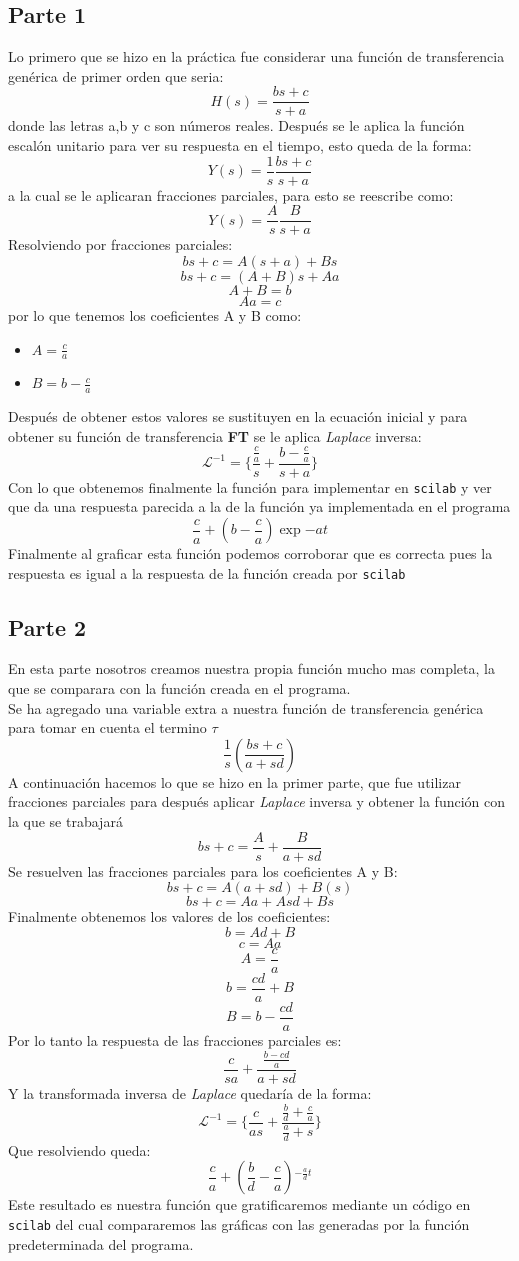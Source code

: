 \documentclass[letterpaper,10pt]{article}
\begin{document}
	\subsection{Parte 1}
	Lo primero que se hizo en la práctica fue considerar una función de transferencia genérica de primer orden que seria:
	\[H(s)=\frac{bs+c}{s+a}\]
	donde las letras a,b y c son números reales. Después se le aplica la función escalón unitario para ver su respuesta en el tiempo, esto queda de la forma:
	\[Y(s)=\frac{1}{s}\frac{bs+c}{s+a}\]
	a la cual se le aplicaran fracciones parciales, para esto se reescribe como:
	\[Y(s)=\frac{A}{s}\frac{B}{s+a}\]
	Resolviendo por fracciones parciales:
	\[bs+c=A(s+a)+Bs\]
	\[bs+c=(A+B)s+Aa\]
	\[A+B=b\]
	\[Aa=c\]
	por lo que tenemos los coeficientes A y B como:
	\begin{itemize}
		\item $A=\frac{c}{a}$
		\item $B=b-\frac{c}{a}$
	\end{itemize}
Después de obtener estos valores se sustituyen en la ecuación inicial y para obtener su función de transferencia \textbf{FT} se le aplica \textit{Laplace} inversa:
\[\mathcal{L}^{-1}=\{\frac{\frac{c}{a}}{s}+\frac{b-\frac{c}{a}}{s+a}\}\]
Con lo que obtenemos finalmente la función para implementar en \texttt{scilab} y ver que da una respuesta parecida a la de la función ya implementada en el programa
\[\frac{c}{a}+(b-\frac{c}{a})\exp{-at} \]
Finalmente al graficar esta función podemos corroborar que es correcta pues la respuesta es igual a la respuesta de la función creada por \texttt{scilab}
\pagebreak 
	\subsection{Parte 2}
	En esta parte nosotros creamos nuestra propia función mucho mas completa, la que se comparara con la función creada en el programa.\\
	Se ha agregado una variable extra a nuestra función de transferencia genérica para tomar en cuenta el termino $\tau$\\
	\[\frac{1}{s}(\frac{bs+c}{a+sd})\]
	A continuación hacemos lo que se hizo en la primer parte, que fue utilizar fracciones parciales para después aplicar \textit{Laplace} inversa y obtener la función con la que se trabajará
	\[bs+c=\frac{A}{s}+\frac{B}{a+sd}\]
	Se resuelven las fracciones parciales para los coeficientes A y B:
	\[bs+c=A(a+sd)+B(s)\]
	\[bs+c=Aa+Asd+Bs\]
	Finalmente obtenemos los valores de los coeficientes:
	\[b=Ad+B\]
	\[c=Aa\]  \[A=\frac{c}{a}\]
	\[b=\frac{cd}{a}+B\]
	\[B=b-\frac{cd}{a}\]
	Por lo tanto la respuesta de las fracciones parciales es:
	\[\frac{c}{sa}+\frac{\frac{b-cd}{a}}{a+sd}\]
	Y la transformada inversa de \textit{Laplace} quedaría de la forma:
	\[\mathcal{L}^{-1}=\{  \frac{c}{as}+\frac{\frac{b}{d}+\frac{c}{a}}{\frac{a}{d}+s}\} \]
	Que resolviendo queda:
	\[\frac{c}{a}+(\frac{b}{d}-\frac{c}{a}) \mathcal{} ^{-\frac{a}{d}t}\]
	Este resultado es nuestra función que gratificaremos mediante un código en \texttt{scilab} del cual compararemos las gráficas con las generadas por la función predeterminada del programa.
\end{document}
